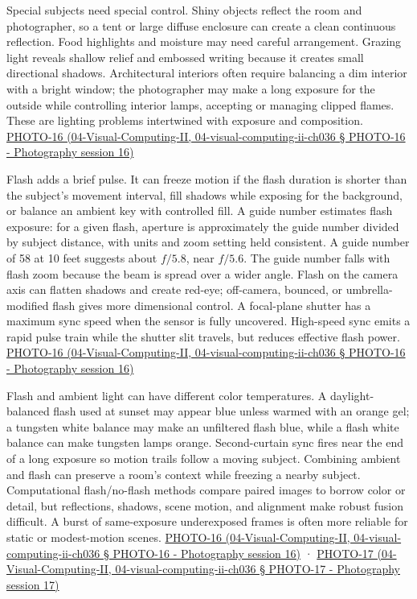 Special subjects need special control. Shiny objects reflect the room and photographer, so a tent or large diffuse enclosure can create a clean continuous reflection. Food highlights and moisture may need careful arrangement. Grazing light reveals shallow relief and embossed writing because it creates small directional shadows. Architectural interiors often require balancing a dim interior with a bright window; the photographer may make a long exposure for the outside while controlling interior lamps, accepting or managing clipped flames. These are lighting problems intertwined with exposure and composition. \href{}{PHOTO-16 (04-Visual-Computing-II, 04-visual-computing-ii-ch036 § PHOTO-16 - Photography session 16)}

Flash adds a brief pulse. It can freeze motion if the flash duration is shorter than the subject's movement interval, fill shadows while exposing for the background, or balance an ambient key with controlled fill. A guide number estimates flash exposure: for a given flash, aperture is approximately the guide number divided by subject distance, with units and zoom setting held consistent. A guide number of 58 at 10 feet suggests about \(f/5.8\), near \(f/5.6\). The guide number falls with flash zoom because the beam is spread over a wider angle. Flash on the camera axis can flatten shadows and create red-eye; off-camera, bounced, or umbrella-modified flash gives more dimensional control. A focal-plane shutter has a maximum sync speed when the sensor is fully uncovered. High-speed sync emits a rapid pulse train while the shutter slit travels, but reduces effective flash power. \href{}{PHOTO-16 (04-Visual-Computing-II, 04-visual-computing-ii-ch036 § PHOTO-16 - Photography session 16)}

Flash and ambient light can have different color temperatures. A daylight-balanced flash used at sunset may appear blue unless warmed with an orange gel; a tungsten white balance may make an unfiltered flash blue, while a flash white balance can make tungsten lamps orange. Second-curtain sync fires near the end of a long exposure so motion trails follow a moving subject. Combining ambient and flash can preserve a room's context while freezing a nearby subject. Computational flash/no-flash methods compare paired images to borrow color or detail, but reflections, shadows, scene motion, and alignment make robust fusion difficult. A burst of same-exposure underexposed frames is often more reliable for static or modest-motion scenes. \href{}{PHOTO-16 (04-Visual-Computing-II, 04-visual-computing-ii-ch036 § PHOTO-16 - Photography session 16)} · \href{}{PHOTO-17 (04-Visual-Computing-II, 04-visual-computing-ii-ch036 § PHOTO-17 - Photography session 17)}

